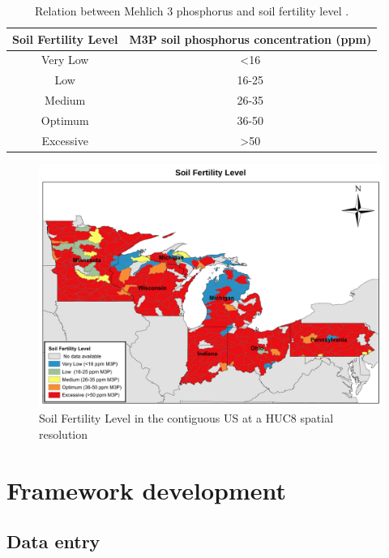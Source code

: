 \begin{refsection}[referencesCh4]
\begin{table}[h]
	\centering
	\caption{Relation between Mehlich 3 phosphorus and soil fertility level \protect\citep{Espinoza2006}.}
	\label{table:ApCsoil_fertility}
	\begin{tabular}{@{}cc@{}}
		\toprule
		Soil Fertility Level & M3P soil phosphorus concentration (ppm) \\ \midrule
		Very Low             & \textless{}16                           \\
		Low                  & 16-25                                   \\
		Medium               & 26-35                                   \\
		Optimum              & 36-50                                   \\
		Excessive            & \textgreater{}50                        \\ \bottomrule
	\end{tabular}
\end{table}


\begin{figure}[h]
	\centering
	\includegraphics[width=0.95\linewidth, trim={0cm 0cm 0cm 0cm},clip]{gfx/AppendixC/SoilFertility.pdf} 
	\caption{Soil Fertility Level in the contiguous US at a HUC8 spatial resolution}
	\label{fig:SoilFertilitySoilFertility}
\end{figure}

\section{Framework development}
\subsection{Data entry}


\end{refsection}
